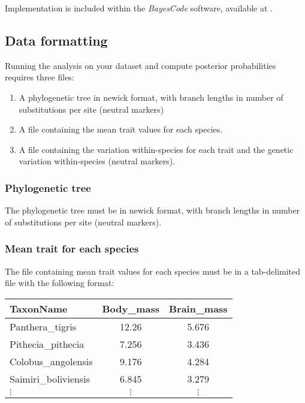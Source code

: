 \documentclass{article}
\begin{document}
Implementation is included within the \textit{BayesCode} software, available at .

\subsection{Data formatting}\label{subsec:data-formatting}

Running the analysis on your dataset and compute posterior probabilities requires three files:
\begin{enumerate}
    \item A phylogenetic tree in newick format, with branch lengths in number of substitutions per site (neutral markers)
    \item A file containing the mean trait values for each species.
    \item A file containing the variation within-species for each trait and the genetic variation within-species (neutral markers).
\end{enumerate}

\subsubsection{Phylogenetic tree}\label{subsubsec:phylogenetic-tree}

The phylogenetic tree must be in newick format, with branch lengths in number of substitutions per site (neutral markers).

\subsubsection{Mean trait for each species}\label{subsubsec:mean-trait-for-each-species}

The file containing mean trait values for each species must be in a tab-delimited file with the following format:
\begin{center}
    \begin{adjustbox}{width = 0.35\textwidth}
        \begin{tabular}{|l|c|c|}
            \hline
            TaxonName            & Body\_mass & Brain\_mass \\
            \hline
            Panthera\_tigris     & 12.26      & 5.676       \\
            Pithecia\_pithecia   & 7.256      & 3.436       \\
            Colobus\_angolensis  & 9.176      & 4.284       \\
            Saimiri\_boliviensis & 6.845      & 3.279       \\
            $\vdots$             & $\vdots$   & $\vdots$    \\
            \hline
        \end{tabular}\label{tab:trait-mean}
    \end{adjustbox}
\end{center}
\end{document}
